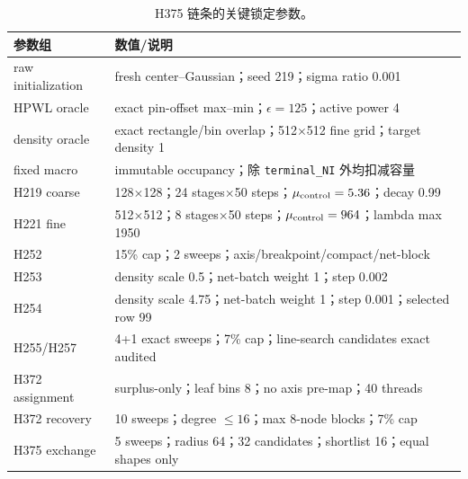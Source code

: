 \documentclass[UTF8,a4paper,11pt]{ctexrep}
\begin{document}
\begin{table}[H]
\centering
\caption{H375 链条的关键锁定参数。}
\label{tab:params}
\small
\begin{tabular}{p{4.3cm}p{10.2cm}}
\toprule
参数组 & 数值/说明\\
\midrule
raw initialization & fresh center--Gaussian；seed 219；sigma ratio 0.001\\
HPWL oracle & exact pin-offset max--min；$\epsilon=125$；active power 4\\
density oracle & exact rectangle/bin overlap；512$\times$512 fine grid；target density 1\\
fixed macro & immutable occupancy；除 \texttt{terminal\_NI} 外均扣减容量\\
H219 coarse & 128$\times$128；24 stages$\times$50 steps；$\mu_{\rm control}=5.36$；decay 0.99\\
H221 fine & 512$\times$512；8 stages$\times$50 steps；$\mu_{\rm control}=964$；lambda max 1950\\
H252 & 15\% cap；2 sweeps；axis/breakpoint/compact/net-block\\
H253 & density scale 0.5；net-batch weight 1；step 0.002\\
H254 & density scale 4.75；net-batch weight 1；step 0.001；selected row 99\\
H255/H257 & 4+1 exact sweeps；7\% cap；line-search candidates exact audited\\
H372 assignment & surplus-only；leaf bins 8；no axis pre-map；40 threads\\
H372 recovery & 10 sweeps；degree $\le16$；max 8-node blocks；7\% cap\\
H375 exchange & 5 sweeps；radius 64；32 candidates；shortlist 16；equal shapes only\\
\bottomrule
\end{tabular}
\end{table}
\end{document}
